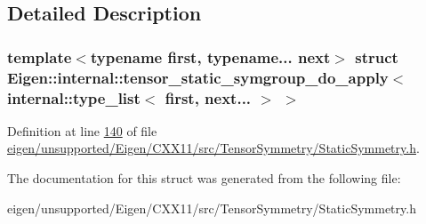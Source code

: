 \subsection{Detailed Description}
\subsubsection*{template$<$typename first, typename... next$>$\newline
struct Eigen\+::internal\+::tensor\+\_\+static\+\_\+symgroup\+\_\+do\+\_\+apply$<$ internal\+::type\+\_\+list$<$ first, next... $>$ $>$}



Definition at line \hyperlink{eigen_2unsupported_2_eigen_2_c_x_x11_2src_2_tensor_symmetry_2_static_symmetry_8h_source_l00140}{140} of file \hyperlink{eigen_2unsupported_2_eigen_2_c_x_x11_2src_2_tensor_symmetry_2_static_symmetry_8h_source}{eigen/unsupported/\+Eigen/\+C\+X\+X11/src/\+Tensor\+Symmetry/\+Static\+Symmetry.\+h}.



The documentation for this struct was generated from the following file\+:\begin{DoxyCompactItemize}
\item 
eigen/unsupported/\+Eigen/\+C\+X\+X11/src/\+Tensor\+Symmetry/\+Static\+Symmetry.\+h\end{DoxyCompactItemize}
